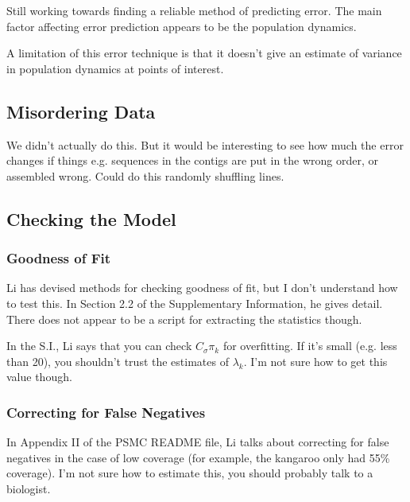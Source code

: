 \documentclass[11pt,a4paper]{article}
\begin{document}
Still working towards finding a reliable method of predicting error. The main factor affecting error prediction appears to be the population dynamics.

A limitation of this error technique is that it doesn't give an estimate of variance in population dynamics at points of interest.

\subsection{Misordering Data}
We didn't actually do this. But it would be interesting to see how much the error changes if things e.g. sequences in the contigs are put in the wrong order, or assembled wrong. Could do this randomly shuffling lines.

\subsection{Checking the Model}

\subsubsection{Goodness of Fit}
Li \cite{li2011inference} has devised methods for checking goodness of fit, but I don't understand how to test this. In Section 2.2 of the Supplementary Information, he gives detail. There does not appear to be a script for extracting the statistics though.

In the S.I., Li says that you can check $C_\sigma\pi_k$ for overfitting. If it's small (e.g. less than 20), you shouldn't trust the estimates of $\lambda_k$. I'm not sure how to get this value though.
\subsubsection{Correcting for False Negatives}
In Appendix II of the PSMC README file, Li talks about correcting for false negatives in the case of low coverage (for example, the kangaroo only had 55\% coverage). I'm not sure how to estimate this, you should probably talk to a biologist.
\end{document}
